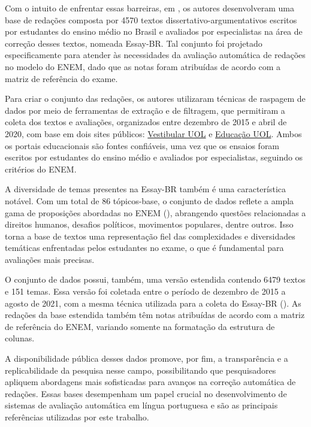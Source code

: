 Com o intuito de enfrentar essas barreiras, em \cite{marinho-et-al-21}, os autores desenvolveram uma base de redações composta por 4570 textos dissertativo-argumentativos escritos por estudantes do ensino médio no Brasil e avaliados por especialistas na área de correção desses textos, nomeada Essay-BR. Tal conjunto foi projetado especificamente para atender às necessidades da avaliação automática de redações no modelo do ENEM, dado que as notas foram atribuídas de acordo com a matriz de referência do exame.

Para criar o conjunto das redações, os autores utilizaram técnicas de raspagem de dados por meio de ferramentas de extração e de filtragem, que permitiram a coleta dos textos e avaliações, organizados entre dezembro de 2015 e abril de 2020, com base em dois sites públicos: \href{https://vestibular.brasilescola.uol.com.br/banco-de-redacoes}{Vestibular UOL} e \href{https://educacao.uol.com.br/bancoderedacoes}{Educação UOL}. Ambos os portais educacionais são fontes confiáveis, uma vez que os ensaios foram escritos por estudantes do ensino médio e avaliados por especialistas, seguindo os critérios do ENEM.

A diversidade de temas presentes na Essay-BR também é uma característica notável. Com um total de 86 tópicos-base, o conjunto de dados reflete a ampla gama de proposições abordadas no ENEM (\cite{stein-2023-temas}), abrangendo questões relacionadas a direitos humanos, desafios políticos, movimentos populares, dentre outros. Isso torna a base de textos uma representação fiel das complexidades e diversidades temáticas enfrentadas pelos estudantes no exame, o que é fundamental para avaliações mais precisas.

O conjunto de dados possui, também, uma versão estendida contendo 6479 textos e 151 temas. Essa versão foi coletada entre o período de dezembro de 2015 a agosto de 2021, com a mesma técnica utilizada para a coleta do Essay-BR (\cite{marinho-et-al-22}). As redações da base estendida também têm notas atribuídas de acordo com a matriz de referência do ENEM, variando somente na formatação da estrutura de colunas.

A disponibilidade pública desses dados promove, por fim, a transparência e a replicabilidade da pesquisa nesse campo, possibilitando que pesquisadores apliquem abordagens mais sofisticadas para avanços na correção automática de redações. Essas bases desempenham um papel crucial no desenvolvimento de sistemas de avaliação automática em língua portuguesa e são as principais referências utilizadas por este trabalho.

